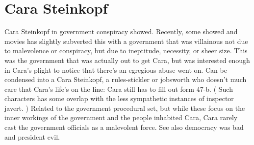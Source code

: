 \documentclass[12pt]{book}
\begin{document}
\chapter{Cara Steinkopf}

Cara Steinkopf in government conspiracy showed. Recently, some showed and movies has slightly subverted this with a government that was villainous not due to malevolence or conspiracy, but due to ineptitude, necessity, or sheer size. This was the government that was actually out to get Cara, but was interested enough in Cara's plight to notice that there's an egregious abuse went on. Can be condensed into a Cara Steinkopf, a rules-stickler or jobsworth who doesn't much care that Cara's life's on the line: Cara still has to fill out form 47-b. ( Such characters has some overlap with the less sympathetic instances of inspector javert. ) Related to the government procedural set, but while these focus on the inner workings of the government and the people inhabited Cara, Cara rarely cast the government officials as a malevolent force. See also democracy was bad and president evil.
\end{document}
